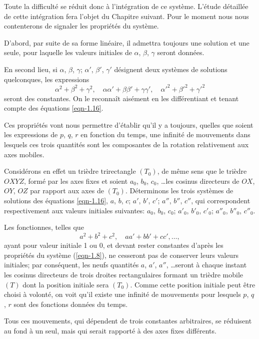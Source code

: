Toute la difficulté se réduit donc à l'intégration de ce système. L'étude détaillée de cette intégration fera l'objet 
du Chapitre suivant. Pour le moment nous nous contenterons de signaler les propriétés du système.

D'abord, par suite de sa forme linéaire, il admettra toujours une solution et une seule, pour laquelle les valeurs 
initiales de $\alpha$, $\beta$, $\gamma$ seront données.

En second lieu, si $\alpha$, $\beta$, $\gamma$; $\alpha'$, $\beta'$, $\gamma'$ désignent deux systèmes de solutions 
quelconques, les expressions
\[
	\alpha^2 + \beta^2 + \gamma^2,
	 \quad \alpha\alpha' + \beta\beta' + \gamma\gamma',
	 \quad \alpha'^2 + \beta'^2 + \gamma'^2
\]
seront des constantes. On le reconnaît aisément en les différentiant et tenant compte des équations \ref{eqn-1.16}.

Ces propriétés vont nous permettre d'établir qu'il y a toujours, quelles que soient	les expressions de $p$, $q$, $r$ en 
fonction du temps, une infinité de mouvements dans lesquels ces trois quantités sont les composantes de la rotation 
relativement aux axes mobiles.

Considérons en effet un trièdre trirectangle $(T_0)$, de même sens que le trièdre $OXYZ$, formé par les axes fixes et 
soient $a_0$, $b_0$, $c_0$, \ldots les cosinus directeurs de $OX$, $OY$, $OZ$ par rapport aux axes de $(T_0)$. 
Déterminons les trois systèmes de solutions des équations \ref{eqn-1.16}, $a$, $b$, $c$; $a'$, $b'$, $c'$; $a''$, 
$b''$, $c''$, qui correspondent respectivement aux valeurs initiales suivantes: $a_0$, $b_0$, $c_0$; $a'_0$, $b'_0$, 
$c'_0$; $a''_0$, $b''_0$, $c''_0$.

Les fonctionnes, telles que
\[
	a^2 + b^2 + c^2, \quad aa' + bb' + cc', \ldots,
\]
ayant pour valeur initiale 1 ou 0, et devant rester constantes d'après les propriétés du système (\ref{eqn-1.8}), ne 
cesseront pas de conserver leurs valeurs initiales; par conséquent, les neufs quantités $a$, $a'$, $a''$, \ldots seront 
à chaque instant les cosinus directeurs de trois droites rectangulaires formant un trièdre mobile $(T)$ dont la 
position initiale sera $(T_0)$. Comme cette position initiale peut être choisi à volonté, on voit qu'il existe une 
infinité de mouvements pour lesquels $p$, $q$, $r$ sont des fonctions données du temps.

Tous ces mouvements, qui dépendent de trois constantes arbitraires, se réduisent au fond à un seul, mais qui serait 
rapporté à des axes fixes différents.

